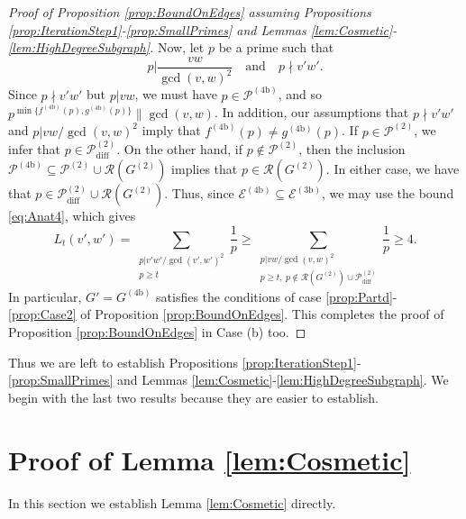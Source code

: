 \documentclass[12pt]{amsart}
\numberwithin{equation}{section}
\theoremstyle{definition}
\theoremstyle{remark}
\newcommand{\CE}{\mathcal{E}}
\newcommand{\CP}{\mathcal{P}}
\newcommand{\CR}{\mathcal{R}}
\renewcommand{\ge}{\geqslant}
\begin{document}
\begin{proof}[Proof of Proposition \ref{prop:BoundOnEdges} assuming Propositions \ref{prop:IterationStep1}-\ref{prop:SmallPrimes} and Lemmas \ref{lem:Cosmetic}-\ref{lem:HighDegreeSubgraph}]
Now, let $p$ be a prime such that
\[
p|\frac{vw}{\gcd(v,w)^2}\quad\text{and}\quad p\nmid v'w'.
\]
Since $p\nmid v'w'$ but $p|vw$, we must have $p\in\CP^{(4\text{b})}$, and so $p^{\min\{f^{(4\text{b})}(p),g^{(4\text{b})}(p)\}}\|\gcd(v,w)$. In addition, our assumptions that $p\nmid v'w'$ and $p|v w/\gcd(v,w)^2$ imply that $f^{(4\text{b})}(p)\ne g^{(4\text{b})}(p)$. 
If $p\in\CP^{(2)}$, we infer that $p\in \CP^{(2)}_{\text{diff}}$. On the other hand, if $p\notin\CP^{(2)}$, then the inclusion $\CP^{(4\text{b})}\subseteq \CP^{(2)}\cup\CR(G^{(2)})$ implies that $p\in \CR(G^{(2)})$. In either case, we have that $p\in\CP^{(2)}_{\text{diff}}\cup\CR(G^{(2)})$. Thus, since $\CE^{(4\text{b})}\subseteq\CE^{(3\text{b})}$, we may use the bound \eqref{eq:Anat4}, which gives
\[
L_t(v',w')=\sum_{\substack{p|v' w'/\gcd(v',w')^2\\ p\ge t}}\frac{1}{p}\ge\sum_{\substack{p|v w/\gcd(v,w)^2\\p\ge t,\ p\notin \CR(G^{(2)})\cup \CP^{(2)}_{\text{diff}}}}\frac{1}{p}\ge 4.
\]
In particular, $G'=G^{(4\text{b})}$ satisfies the conditions of case \ref{prop:Partd}-\ref{prop:Case2} of Proposition \ref{prop:BoundOnEdges}. This completes the proof of Proposition \ref{prop:BoundOnEdges} in Case (b) too.
\end{proof}



Thus we are left to establish Propositions \ref{prop:IterationStep1}-\ref{prop:SmallPrimes} and Lemmas \ref{lem:Cosmetic}-\ref{lem:HighDegreeSubgraph}. We begin with the last two results because they are easier to establish.


\section{Proof of Lemma \ref{lem:Cosmetic}}\label{sec:CosmeticProof}

In this section we establish Lemma \ref{lem:Cosmetic} directly.
\end{document}
